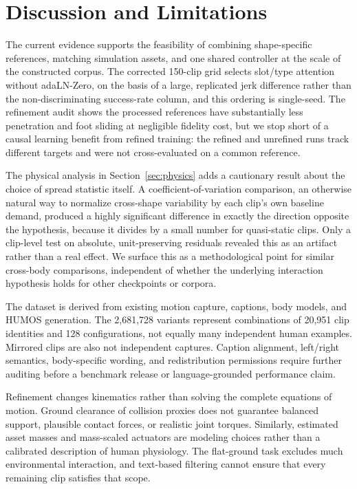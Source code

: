\section{Discussion and Limitations}\label{sec:discussion}

The current evidence supports the feasibility of combining shape-specific
references, matching simulation assets, and one shared controller at the
scale of the constructed corpus. The corrected 150-clip grid selects
slot/type attention without adaLN-Zero, on the basis of a large, replicated
jerk difference rather than the non-discriminating success-rate column, and
this ordering is single-seed. The refinement audit shows the processed
references have substantially less penetration and foot sliding at negligible
fidelity cost, but we stop short of a causal learning benefit from refined
training: the refined and unrefined runs track different targets and were
not cross-evaluated on a common reference.

The physical analysis in Section~\ref{sec:physics} adds a cautionary result
about the choice of spread statistic itself. A coefficient-of-variation
comparison, an otherwise natural way to normalize cross-shape variability by
each clip's own baseline demand, produced a highly significant difference in
exactly the direction opposite the hypothesis, because it divides by a small
number for quasi-static clips. Only a clip-level test on absolute,
unit-preserving residuals revealed this as an artifact rather than a real
effect. We surface this as a methodological point for similar cross-body
comparisons, independent of whether the underlying interaction hypothesis
holds for other checkpoints or corpora.

The dataset is derived from existing motion capture, captions, body models,
and HUMOS generation. The 2,681,728 variants represent combinations of
20,951 clip identities and 128 configurations, not equally many independent
human examples. Mirrored clips are also not independent captures.
Caption alignment, left/right semantics, body-specific wording, and
redistribution permissions require further auditing before a benchmark
release or language-grounded performance claim.

Refinement changes kinematics rather than solving the complete equations
of motion. Ground clearance of collision proxies does not guarantee
balanced support, plausible contact forces, or realistic joint torques.
Similarly, estimated asset masses and mass-scaled actuators are modeling
choices rather than a calibrated description of human physiology. The
flat-ground task excludes much environmental interaction, and text-based
filtering cannot ensure that every remaining clip satisfies that scope.

